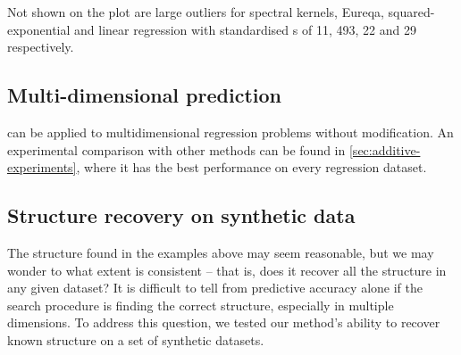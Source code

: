 Not shown on the plot are large outliers for spectral kernels, Eureqa, squared-exponential and linear regression with standardised \RMSE{}s of 11, 493, 22 and 29 respectively.







\subsection{Multi-dimensional prediction}

\procedurename{} can be applied to multidimensional regression problems without modification.
An experimental comparison with other methods can be found in \cref{sec:additive-experiments}, where it has the best performance on every regression dataset.%



\subsection{Structure recovery on synthetic data}
\label{sec:synthetic}

The structure found in the examples above may seem reasonable, but we may wonder to what extent \procedurename{} is consistent -- that is, does it recover all the structure in any given dataset?
It is difficult to tell from predictive accuracy alone if the search procedure is finding the correct structure, especially in multiple dimensions.
To address this question, we tested our method's ability to recover known structure on a set of synthetic datasets.

